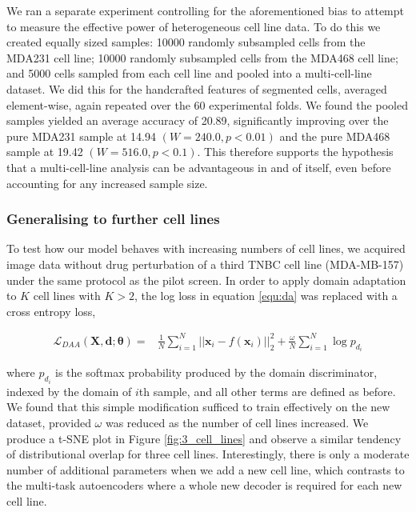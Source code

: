 We ran a separate experiment controlling for the aforementioned bias to attempt to measure the effective power of heterogeneous cell line data. To do this we created equally sized samples: 10000 randomly subsampled cells from the MDA231 cell line; 10000 randomly subsampled cells from the MDA468 cell line; and 5000 cells sampled from each cell line and pooled into a multi-cell-line dataset. We did this for the handcrafted features of segmented cells, averaged element-wise, again repeated over the 60 experimental folds. We found the pooled samples yielded an average accuracy of 20.89, significantly improving over the pure MDA231 sample at 14.94 $(W=240.0, p < 0.01)$ and the pure MDA468 sample at 19.42 $(W=516.0, p < 0.1)$. This therefore supports the hypothesis that a multi-cell-line analysis can be advantageous in and of itself, even before accounting for any increased sample size.

\subsubsection{Generalising to further cell lines}
\label{subsubsec:generalising}

To test how our model behaves with increasing numbers of cell lines, we acquired image data without drug perturbation of a third TNBC cell line (MDA-MB-157) under the same protocol as the pilot screen. In order to apply domain adaptation to $K$ cell lines with $K>2$, the log loss in equation \ref{equ:da} was replaced with a cross entropy loss,


\begin{align}
\mathcal{L}_{DAA}(\mathbf{X}, \mathbf{d} ; \boldsymbol\theta) ={} & \frac{1}{N}\sum_{i=1}^N||\mathbf{x}_i - f(\mathbf{x}_i)||_2^2 + \frac{\omega}{N}\sum_{i=1}^N \log p_{d_i}
\end{align}

where $p_{d_i}$ is the softmax probability produced by the domain discriminator, indexed by the domain of $i$th sample, and all other terms are defined as before. We found that this simple modification sufficed to train effectively on the new dataset, provided $\omega$ was reduced as the number of cell lines increased. We produce a t-SNE plot in Figure \ref{fig:3_cell_lines} and observe a similar tendency of distributional overlap for three cell lines. Interestingly, there is only a moderate number of additional parameters when we add a new cell line, which contrasts to the multi-task autoencoders where a whole new decoder is required for each new cell line.

